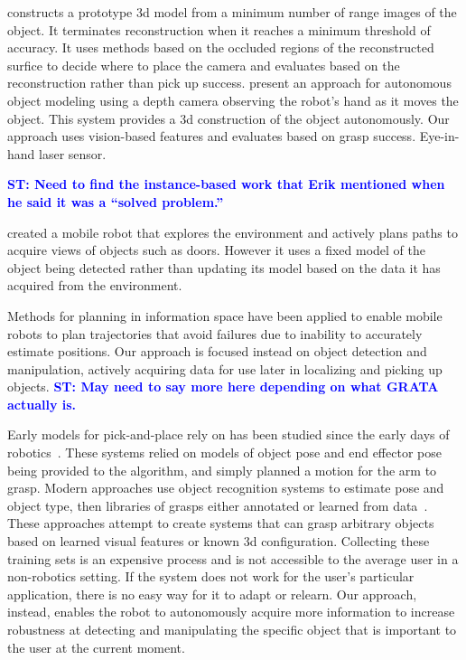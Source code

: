 \documentclass{article}
\newcommand{\stnote}[1]{\textcolor{blue}{\textbf{ST: #1}}}
\begin{document}
\citet{banta00} constructs a prototype 3d model from a minimum number
of range images of the object.  It terminates reconstruction when it
reaches a minimum threshold of accuracy.  It uses methods based on the
occluded regions of the reconstructed surfice to decide where to place
the camera and evaluates based on the reconstruction rather than pick
up success.  \citet{krainin11} present an approach for autonomous
object modeling using a depth camera observing the robot's hand as it
moves the object.  This system provides a 3d construction of the
object autonomously.  Our approach uses vision-based features and
evaluates based on grasp success.  Eye-in-hand laser
sensor.~\citep{aeotti14}

\stnote{Need to find the instance-based work that Erik mentioned when
  he said it was a ``solved problem.''}

\citet{velez11} created a mobile robot that explores the environment
and actively plans paths to acquire views of objects such as doors.
However it uses a fixed model of the object being detected rather than
updating its model based on the data it has acquired from the
environment.

Methods for planning in information space \citep{he08, atanasov13,
  prentice09} have been applied to enable mobile robots to plan
trajectories that avoid failures due to inability to accurately
estimate positions.  Our approach is focused instead on
object detection and manipulation, actively acquiring data for use
later in localizing and picking up objects. \stnote{May need to say
  more here depending on what GRATA actually is.}


Early models for pick-and-place rely on has been studied since the
early days of robotics~\citep{brooks83, lozano89}.  These systems
relied on models of object pose and end effector pose being provided to the
algorithm, and simply planned a motion for the arm to grasp.  Modern
approaches use object recognition systems to estimate pose and object
type, then libraries of grasps either annotated or learned from
data~\citep{saxena08, goldfeder09, morales03}.  These approaches
attempt to create systems that can grasp arbitrary objects based on
learned visual features or known 3d configuration.  Collecting these
training sets is an expensive process and is not accessible to the
average user in a non-robotics setting.  If the system does not work
for the user's particular application, there is no easy way for it to
adapt or relearn.  Our approach, instead, enables the robot to
autonomously acquire more information to increase robustness at
detecting and manipulating the specific object that is important to
the user at the current moment.
\end{document}
